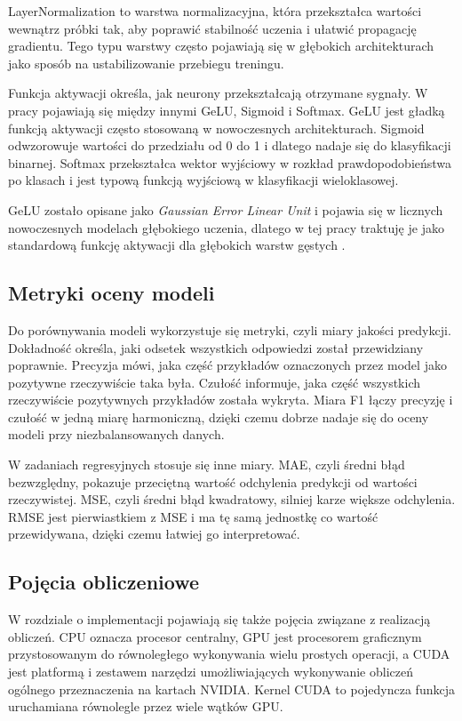 LayerNormalization to warstwa normalizacyjna, która przekształca wartości wewnątrz próbki tak, aby poprawić stabilność uczenia i ułatwić propagację gradientu. Tego typu warstwy często pojawiają się w głębokich architekturach jako sposób na ustabilizowanie przebiegu treningu.

Funkcja aktywacji określa, jak neurony przekształcają otrzymane sygnały. W pracy pojawiają się między innymi GeLU, Sigmoid i Softmax. GeLU jest gładką funkcją aktywacji często stosowaną w nowoczesnych architekturach. Sigmoid odwzorowuje wartości do przedziału od 0 do 1 i dlatego nadaje się do klasyfikacji binarnej. Softmax przekształca wektor wyjściowy w rozkład prawdopodobieństwa po klasach i jest typową funkcją wyjściową w klasyfikacji wieloklasowej.

GeLU zostało opisane jako \textit{Gaussian Error Linear Unit} i pojawia się w licznych nowoczesnych modelach głębokiego uczenia, dlatego w tej pracy traktuję je jako standardową funkcję aktywacji dla głębokich warstw gęstych \cite{hendrycks2023gaussian}.

\subsection{Metryki oceny modeli}

Do porównywania modeli wykorzystuje się metryki, czyli miary jakości predykcji. Dokładność określa, jaki odsetek wszystkich odpowiedzi został przewidziany poprawnie. Precyzja mówi, jaka część przykładów oznaczonych przez model jako pozytywne rzeczywiście taka była. Czułość informuje, jaka część wszystkich rzeczywiście pozytywnych przykładów została wykryta. Miara F1 łączy precyzję i czułość w jedną miarę harmoniczną, dzięki czemu dobrze nadaje się do oceny modeli przy niezbalansowanych danych.

W zadaniach regresyjnych stosuje się inne miary. MAE, czyli średni błąd bezwzględny, pokazuje przeciętną wartość odchylenia predykcji od wartości rzeczywistej. MSE, czyli średni błąd kwadratowy, silniej karze większe odchylenia. RMSE jest pierwiastkiem z MSE i ma tę samą jednostkę co wartość przewidywana, dzięki czemu łatwiej go interpretować.

\subsection{Pojęcia obliczeniowe}

W rozdziale o implementacji pojawiają się także pojęcia związane z realizacją obliczeń. CPU oznacza procesor centralny, GPU jest procesorem graficznym przystosowanym do równoległego wykonywania wielu prostych operacji, a CUDA jest platformą i zestawem narzędzi umożliwiających wykonywanie obliczeń ogólnego przeznaczenia na kartach NVIDIA. Kernel CUDA to pojedyncza funkcja uruchamiana równolegle przez wiele wątków GPU.

